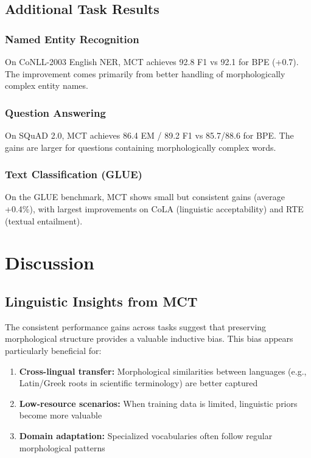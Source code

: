 \documentclass[conference]{IEEEtran}
\begin{document}
\subsection{Additional Task Results}

\subsubsection{Named Entity Recognition}
On CoNLL-2003 English NER, MCT achieves 92.8 F1 vs 92.1 for BPE (+0.7). The improvement comes primarily from better handling of morphologically complex entity names.

\subsubsection{Question Answering}
On SQuAD 2.0, MCT achieves 86.4 EM / 89.2 F1 vs 85.7/88.6 for BPE. The gains are larger for questions containing morphologically complex words.

\subsubsection{Text Classification (GLUE)}
On the GLUE benchmark, MCT shows small but consistent gains (average +0.4\%), with largest improvements on CoLA (linguistic acceptability) and RTE (textual entailment).

\section{Discussion}
\label{sec:discussion}

\subsection{Linguistic Insights from MCT}
The consistent performance gains across tasks suggest that preserving morphological structure provides a valuable inductive bias. This bias appears particularly beneficial for:
\begin{enumerate}
    \item \textbf{Cross-lingual transfer:} Morphological similarities between languages (e.g., Latin/Greek roots in scientific terminology) are better captured
    \item \textbf{Low-resource scenarios:} When training data is limited, linguistic priors become more valuable
    \item \textbf{Domain adaptation:} Specialized vocabularies often follow regular morphological patterns
\end{enumerate}
\end{document}
